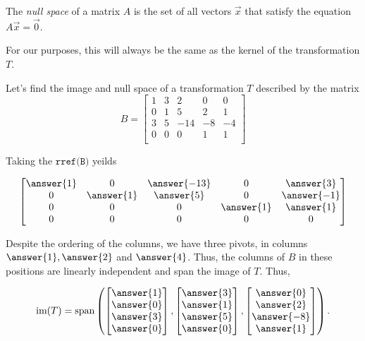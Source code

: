 \documentclass{ximera}
\begin{document}
\begin{definition}
  The \emph{null space} of a matrix $A$ is the set of all vectors $\vec{x}$ that satisfy the equation $A\vec{x}=\vec{0}$.

  For our purposes, this will always be the same as the kernel of the transformation $T$.
\end{definition}

\begin{example}
  Let's find the image and null space of a transformation $T$ described by the matrix 
  $$B=\begin{bmatrix}
        1 & 3 & 2 & 0 & 0  \\
        0 & 1 & 5 & 2 & 1  \\
        3 & 5 & -14 & -8 &-4  \\
        0 & 0 & 0 & 1 & 1  \\
        \end{bmatrix}$$

  Taking the $\texttt{rref(B)}$ yeilds

  $$\begin{bmatrix}
    \answer{1} & 0 & \answer{-13} & 0 & \answer{3} \\
    0 & \answer{1} & \answer{5} & 0 & \answer{-1} \\
    0 & 0 & 0 & \answer{1} & \answer{1} \\
    0 & 0 & 0 & 0 & 0
  \end{bmatrix}$$

  Despite the ordering of the columns, we have three pivots, in columns $\answer{1}, \answer{2}$ and $\answer{4}$. Thus, the columns of $B$ in these positions are linearly independent and span the image of $T$. Thus,

  $$\mbox{im}(T)=\mbox{span}\left(
  \begin{bmatrix}
  \answer{1} \\
  \answer{0} \\
  \answer{3} \\
  \answer{0}
  \end{bmatrix},
  \begin{bmatrix}
  \answer{3} \\
  \answer{1} \\
  \answer{5} \\
  \answer{0}
  \end{bmatrix},
  \begin{bmatrix}
  \answer{0} \\
  \answer{2} \\
  \answer{-8} \\
  \answer{1}
  \end{bmatrix}
  \right).$$


\end{example}
\end{document}
